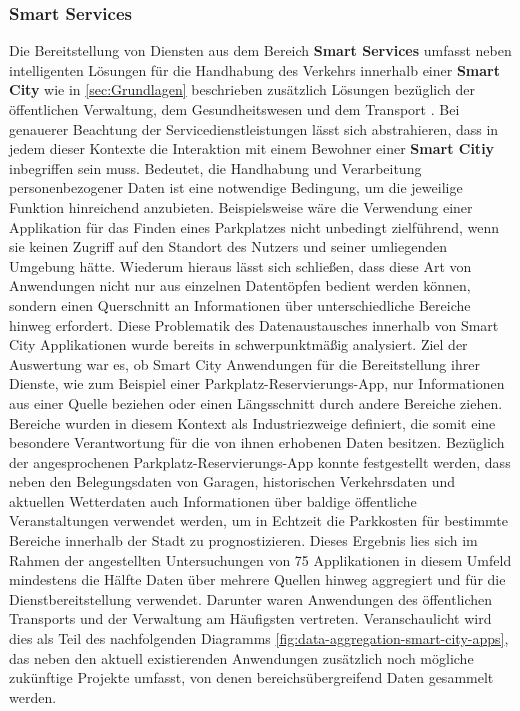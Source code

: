 \subsubsection{Smart Services}
\label{sec:Analyse der Datenerhebung:ssec:Smart City:sssec:Smart Services}

Die Bereitstellung von Diensten aus dem Bereich \textbf{Smart Services} umfasst neben intelligenten Lösungen für die Handhabung des Verkehrs innerhalb einer \textbf{Smart City} wie in \ref{sec:Grundlagen} beschrieben zusätzlich Lösungen bezüglich der öffentlichen Verwaltung, dem Gesundheitswesen und dem Transport \cite{SecPrivSmartCity2021}. Bei genauerer Beachtung der Servicedienstleistungen lässt sich abstrahieren, dass in jedem dieser Kontexte die Interaktion mit einem Bewohner einer \textbf{Smart Citiy} inbegriffen sein muss.
Bedeutet, die Handhabung und Verarbeitung personenbezogener Daten ist eine notwendige Bedingung, um die jeweilige Funktion hinreichend anzubieten. Beispielsweise wäre die Verwendung einer Applikation für das Finden eines Parkplatzes nicht unbedingt zielführend, wenn sie keinen Zugriff auf den Standort des Nutzers und seiner umliegenden Umgebung hätte. 
Wiederum hieraus lässt sich schließen, dass diese Art von Anwendungen nicht nur aus einzelnen Datentöpfen bedient werden können, sondern einen Querschnitt an Informationen über unterschiedliche Bereiche hinweg erfordert. 
Diese Problematik des Datenaustausches innerhalb von Smart City Applikationen wurde bereits in \cite{BCG2020} schwerpunktmäßig analysiert. Ziel der Auswertung war es, ob Smart City Anwendungen für die Bereitstellung ihrer Dienste, wie zum Beispiel einer Parkplatz-Reservierungs-App, nur Informationen aus einer Quelle beziehen oder einen Längsschnitt durch andere Bereiche ziehen. 
Bereiche wurden in diesem Kontext als Industriezweige definiert, die somit eine besondere Verantwortung für die von ihnen erhobenen Daten besitzen. Bezüglich der angesprochenen Parkplatz-Reservierungs-App konnte festgestellt werden, dass neben den Belegungsdaten von Garagen, historischen Verkehrsdaten und aktuellen Wetterdaten auch Informationen über baldige öffentliche Veranstaltungen verwendet werden, um in Echtzeit die Parkkosten für bestimmte Bereiche innerhalb der Stadt zu prognostizieren. 
Dieses Ergebnis lies sich im Rahmen der angestellten Untersuchungen von 75 Applikationen in diesem Umfeld mindestens die Hälfte Daten über mehrere Quellen hinweg aggregiert und für die Dienstbereitstellung verwendet. 
Darunter waren Anwendungen des öffentlichen Transports und der Verwaltung am Häufigsten vertreten. Veranschaulicht wird dies als Teil des nachfolgenden Diagramms \ref{fig:data-aggregation-smart-city-apps}, das neben den aktuell existierenden Anwendungen zusätzlich noch mögliche zukünftige Projekte umfasst, von denen bereichsübergreifend Daten gesammelt werden.

